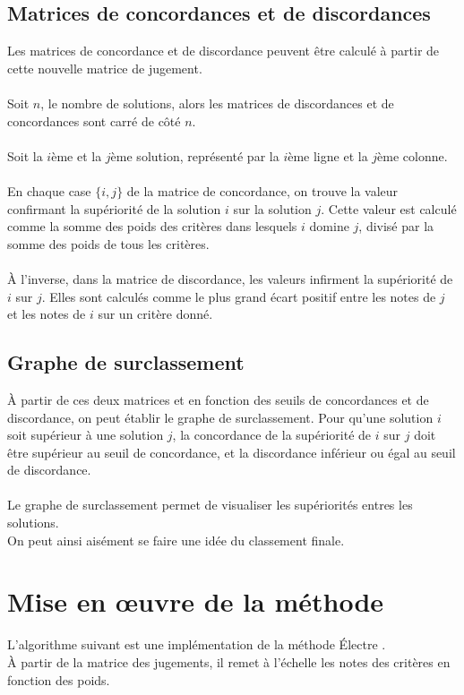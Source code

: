 \subsection{Matrices de concordances et de discordances}
Les matrices de concordance et de discordance peuvent être calculé à partir de cette nouvelle matrice de jugement.\\
~\\
Soit $n$, le nombre de solutions, alors les matrices de discordances et de concordances sont carré de côté $n$.\\
~\\
Soit la $i$ème et la $j$ème solution, représenté par la $i$ème ligne et la $j$ème colonne.\\
~\\
En chaque case $\{i,j\}$ de la matrice de concordance, on trouve la valeur confirmant la supériorité de la solution $i$ sur la solution $j$. Cette valeur est calculé comme la somme des poids des critères dans lesquels $i$ domine $j$, divisé par la somme des poids de tous les critères.\\
~\\
À l'inverse, dans la matrice de discordance, les valeurs infirment la supériorité de $i$ sur $j$. Elles sont calculés comme le plus grand écart positif entre les notes de $j$ et les notes de $i$ sur un critère donné.\\

\subsection{Graphe de surclassement}

À partir de ces deux matrices et en fonction des seuils de concordances et de discordance, on peut établir le graphe de surclassement.
Pour qu'une solution $i$ soit supérieur à une solution $j$, la concordance de la supériorité de $i$ sur $j$ doit être supérieur au seuil de concordance, et la discordance inférieur ou égal au seuil de discordance.\\
~\\
Le graphe de surclassement permet de visualiser les supériorités entres les solutions.\\
On peut ainsi aisément se faire une idée du classement finale.\\

\section{Mise en œuvre de la méthode}
L'algorithme suivant est une implémentation de la méthode Électre .\\
À partir de la matrice des jugements, il remet à l'échelle les notes des critères en fonction des poids.

